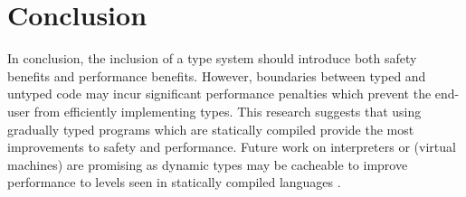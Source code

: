 \section{Conclusion}
In conclusion, the inclusion of a type system should introduce both safety benefits and performance benefits. However, boundaries between typed and untyped code may incur significant performance penalties which prevent the end-user from efficiently implementing types. This research suggests that using gradually typed programs which are statically compiled provide the most improvements to safety and performance. Future work on interpreters or (virtual machines) are promising as dynamic types may be cacheable to improve performance to levels seen in statically compiled languages \cite{vmAlreadyKnewThat2017}. 